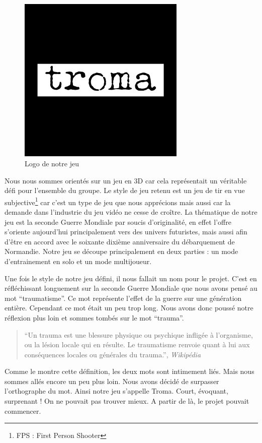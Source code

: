 \documentclass[11pt]{report}
\begin{document}
\begin{figure}[htbp]
\centering
\includegraphics[width=8cm]{troma.png}
\caption{Logo de notre jeu}
\end{figure}

Nous nous sommes orientés sur un jeu en 3D car cela représentait un véritable défi pour l'ensemble du groupe. Le style de jeu retenu est un jeu de tir en vue subjective\footnote{FPS : First Person Shooter} car c'est un type de jeu que nous apprécions mais aussi car la demande dans l'industrie du jeu vidéo ne cesse de croître. La thématique de notre jeu est la seconde Guerre Mondiale par soucis d'originalité, en effet l'offre s'oriente aujourd'hui principalement vers des univers futuristes, mais aussi afin d'être en accord avec le soixante dixième anniversaire du débarquement de Normandie. Notre jeu se découpe principalement en deux parties : un mode d'entrainement en solo et un mode multijoueur.

Une fois le style de notre jeu défini, il nous fallait un nom pour le projet. C'est en réfléchissant longuement sur la seconde Guerre Mondiale que nous avons pensé au mot ``traumatisme''. Ce mot représente l'effet de la guerre sur une génération entière. Cependant ce mot était un peu trop long. Nous avons donc poussé notre réflexion plus loin et sommes tombés sur le mot ``trauma''.

\begin{quote}
``Un trauma est une blessure physique ou psychique infligée à l'organisme, ou la lésion locale qui en résulte. Le traumatisme renvoie quant à lui aux conséquences locales ou générales du trauma.'', \emph{Wikipédia}
\end{quote}

Comme le montre cette définition, les deux mots sont intimement liés. Mais nous sommes allés encore un peu plus loin. Nous avons décidé de surpasser l'orthographe du mot. Ainsi notre jeu s'appelle Troma. Court, évoquant, surprenant ! On ne pouvait pas trouver mieux. A partir de là, le projet pouvait commencer. 
\end{document}
